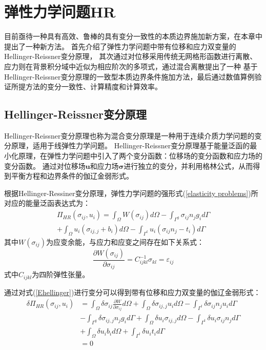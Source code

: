 \chapter{弹性力学问题HR}
目前亟待一种具有高效、鲁棒的具有变分一致性的本质边界施加新方案，在本章中提出了一种新方法。
首先介绍了弹性力学问题中带有位移和应力双变量的Hellinger-Reissner变分原理，
其次通过对位移采用传统无网格形函数进行离散、应力则在背景积分域中近似为相应阶次的多项式，通过混合离散提出了一种
基于Hellinger-Reissner变分原理的一致型本质边界条件施加方法，最后通过数值算例验证所提方法的变分一致性、计算精度和计算效率。
\section{Hellinger-Reissner变分原理}
Hellinger-Reissner变分原理也称为混合变分原理是一种用于连续介质力学问题的变分原理，适用于线弹性力学问题。
Hellinger-Reissner变分原理基于能量泛函的最小化原理，在弹性力学问题中引入了两个变分函数：位移场的变分函数和应力场的变分函数。
通过对位移场$\pmb{u}$和应力场$\pmb{\sigma}$进行独立的变分，并利用格林公式，从而得到平衡方程和边界条件的伽辽金弱形式。\par
根据Hellinger-Ressiner变分原理\cite{}，弹性力学问题的强形式(\ref{elasticity problems})所对应的能量泛函表达式为：
\begin{equation}
\begin{split}\label{Ehellinger}
    \Pi_{H\!R}(\sigma_{ij},u_i)=\int_{\Omega}W(\sigma_{ij})d\Omega-\int_{\Gamma^g}\sigma_{ij}n_jg_id\Gamma\\
    +\int_{\Omega}u_i(\sigma_{ij,j}+b_i)d\Omega-\int_{\Gamma^t}u_i(\sigma_{ij} n_j-t_i)d\Gamma
\end{split}
\end{equation}
其中$W(\sigma_{ij})$为应变余能，与应力和应变之间存在如下关系式：
\begin{equation}
\frac{\partial W(\sigma_{ij})}{\partial\sigma_{ij}}=C^{-1}_{ijkl}\sigma_{kl}=\varepsilon_{ij}
\end{equation}
式中$C_{ijkl}$为四阶弹性张量。\par
通过对式(\ref{Ehellinger})进行变分可以得到带有位移和应力双变量的伽辽金弱形式：
\begin{equation}\label{weak form1}
\begin{split} 
    \delta\Pi_{H\!R}(\sigma_{ij},u_i)&=\int_{\Omega}\delta\sigma_{ij}\frac{\partial W}{\partial \sigma_{ij}}d\Omega+\int_{\Omega}\delta\sigma_{ij,j}u_id\Omega-\int_{\Gamma^t}\delta\sigma_{ij}n_ju_id\Gamma\\
    &-\int_{\Gamma^g}\delta\sigma_{ij,j}n_jg_id\Gamma+\int_{\Omega}\delta u_i\sigma_{ij,j}d\Omega- \int_{\Gamma^t}\delta u_i\sigma_{ij}n_jd\Gamma\\
    &+\int_{\Omega}\delta u_ib_id\Omega+\int_{\Gamma^t}\delta u_it_id\Gamma\\
    &=0
\end{split}
\end{equation}
